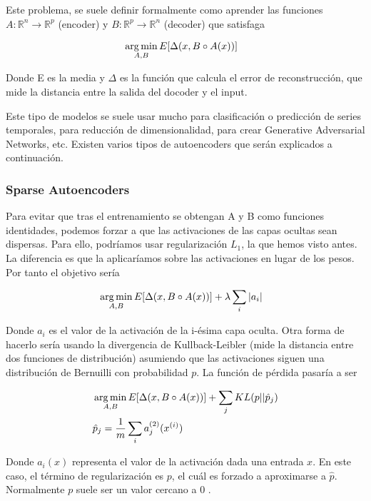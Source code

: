 Este problema, se suele definir formalmente como aprender las funciones $A: \mathbb{R}^n \rightarrow \mathbb{R}^p$ (encoder) y $B: \mathbb{R}^p \rightarrow \mathbb{R}^n$ (decoder) que satisfaga

\begin{align}
	&\operatorname*{arg\,min}_{A,B}E[\Delta (x, B \circ A(x))]
\end{align}

Donde E es la media y $\Delta$ es la función que calcula el error de reconstrucción, que mide la distancia entre la salida del docoder y el input.\newline

Este tipo de modelos se suele usar mucho para clasificación o predicción de series temporales, para reducción de dimensionalidad, para crear Generative Adversarial Networks, etc. Existen varios tipos de autoencoders que serán explicados a continuación.

\subsubsection{Sparse Autoencoders}

Para evitar que tras el entrenamiento se obtengan A y B como funciones identidades, podemos forzar a que las activaciones de las capas ocultas sean dispersas. Para ello, podríamos usar regularización $L_1$, la que hemos visto antes. La diferencia es que la aplicaríamos sobre las activaciones en lugar de los pesos. Por tanto el objetivo sería

\begin{align}
	&\operatorname*{arg\,min}_{A,B}E[\Delta (x, B \circ A(x))] + \lambda \sum_i |a_i|
\end{align}

Donde $a_i$ es el valor de la activación de la i-ésima capa oculta. Otra forma de hacerlo sería usando la divergencia de Kullback-Leibler (mide la distancia entre dos funciones de distribución) asumiendo que las activaciones siguen una distribución de Bernuilli con probabilidad $p$. La función de pérdida pasaría a ser

\begin{align}
	&\operatorname*{arg\,min}_{A,B}E[\Delta (x, B \circ A(x))] + \sum_j KL(p||\hat{p}_j)\\
	&\hat{p}_j = \frac{1}{m} \sum_i a_j^{(2)}(x^{(i)})
\end{align}

Donde $a_i(x)$ representa el valor de la activación dada una entrada $x$. En este caso, el término de regularización es $p$, el cuál es forzado a aproximarse a $\hat{p}$. Normalmente $p$ suele ser un valor cercano a 0 \cite{ng, bank2020autoencoders}.

